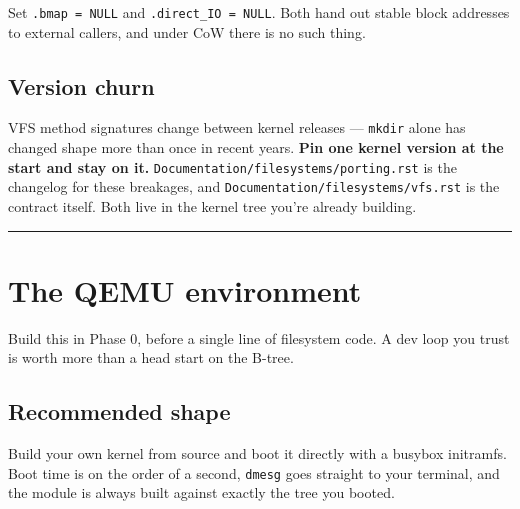Set \texttt{.bmap\ =\ NULL} and \texttt{.direct\_IO\ =\ NULL}. Both hand out stable block addresses to
external callers, and under CoW there is no such thing.

\hypertarget{version-churn}{%
\subsection{Version churn}\label{version-churn}}

VFS method signatures change between kernel releases --- \texttt{mkdir} alone has changed shape
more than once in recent years. \textbf{Pin one kernel version at the start and stay on it.}
\texttt{Documentation/filesystems/porting.rst} is the changelog for these breakages, and
\texttt{Documentation/filesystems/vfs.rst} is the contract itself. Both live in the kernel tree
you're already building.

\begin{center}\rule{0.5\linewidth}{0.5pt}\end{center}

\hypertarget{the-qemu-environment}{%
\section{The QEMU environment}\label{the-qemu-environment}}

Build this in Phase 0, before a single line of filesystem code. A dev loop you trust is
worth more than a head start on the B-tree.

\hypertarget{recommended-shape}{%
\subsection{Recommended shape}\label{recommended-shape}}

Build your own kernel from source and boot it directly with a busybox initramfs. Boot
time is on the order of a second, \texttt{dmesg} goes straight to your terminal, and the module
is always built against exactly the tree you booted.

\begin{Shaded}
\begin{Highlighting}[]
 \DataTypeTok{\textbackslash{}}
   \DataTypeTok{\textbackslash{}}
    \DataTypeTok{\textbackslash{}}
  \DataTypeTok{\textbackslash{}}
     \DataTypeTok{\textbackslash{}}
  \DataTypeTok{\textbackslash{}}
  \DataTypeTok{\textbackslash{}}
\end{Highlighting}
\end{Shaded}

